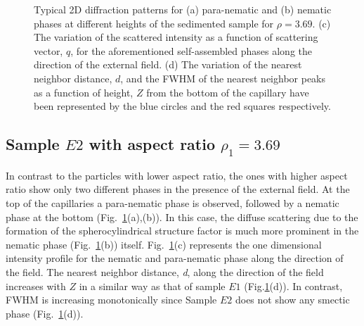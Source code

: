 \documentclass[aps,prl,preprint,superscriptaddress]{revtex4-1} %
\begin{document}
\begin{figure}[t]
\caption{Typical 2D diffraction patterns for (a) para-nematic and (b) nematic phases at different heights of the sedimented sample for $\rho=3.69$. (c) The variation of the scattered intensity as a function of scattering vector, $q$, for the aforementioned self-assembled phases along the direction of the external field. (d) The variation of the nearest neighbor distance, $d$, and the FWHM of the nearest neighbor peaks as a function of height, $Z$ from the bottom of the capillary have been represented by the blue circles and the red squares respectively.}\label{z_scan_high}
\end{figure}
\subsection{Sample $E2$ with aspect ratio $\rho_1 = 3.69$}
In contrast to the particles with lower aspect ratio, the ones with higher aspect ratio show only two different phases in the presence of the external field. At the top of the capillaries a para-nematic phase is observed, followed by a nematic phase at the bottom (Fig.~\ref{z_scan_high}(a),(b)). In this case, the diffuse scattering due to the formation of the spherocylindrical structure factor is much more prominent in the nematic phase (Fig.~\ref{z_scan_high}(b)) itself. Fig.~\ref{z_scan_high}(c) represents the one dimensional intensity profile for the nematic and para-nematic phase along the direction of the field. The nearest neighbor distance, \emph{d}, along the direction of the field increases with $Z$ in a similar way as that of sample $E1$ (Fig.\ref{z_scan_high}(d)). In contrast, FWHM is increasing monotonically since Sample $E2$ does not show any smectic phase (Fig.~\ref{z_scan_high}(d)). \par
\end{document}
